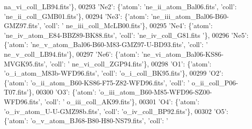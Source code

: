 \begin{DoxyCode}
{      na\_vi\_coll\_LB94.fits'}\},
00293                              \textcolor{stringliteral}{'Ne2'}: \{\textcolor{stringliteral}{'atom'}: \textcolor{stringliteral}{'ne\_ii\_atom\_Bal06.fits'}, \textcolor{stringliteral}{'coll'}: \textcolor{stringliteral}{'ne\_ii\_coll\_GMB01.fits'}\},
00294                              \textcolor{stringliteral}{'Ne3'}: \{\textcolor{stringliteral}{'atom'}: \textcolor{stringliteral}{'ne\_iii\_atom\_Bal06-B60-GMZ97.fits'}, \textcolor{stringliteral}{'coll'}: \textcolor{stringliteral}{'
      ne\_iii\_coll\_McLB00.fits'}\},
00295                              \textcolor{stringliteral}{'Ne4'}: \{\textcolor{stringliteral}{'atom'}: \textcolor{stringliteral}{'ne\_iv\_atom\_E84-BBZ89-BK88.fits'}, \textcolor{stringliteral}{'coll'}: \textcolor{stringliteral}{'ne\_iv\_coll\_G81.fits
      '}\},
00296                              \textcolor{stringliteral}{'Ne5'}: \{\textcolor{stringliteral}{'atom'}: \textcolor{stringliteral}{'ne\_v\_atom\_Bal06-B60-M83-GMZ97-U-BD93.fits'}, \textcolor{stringliteral}{'coll'}: \textcolor{stringliteral}{'
      ne\_v\_coll\_LB94.fits'}\},
00297                              \textcolor{stringliteral}{'Ne6'}: \{\textcolor{stringliteral}{'atom'}: \textcolor{stringliteral}{'ne\_vi\_atom\_Bal06-KS86-MVGK95.fits'}, \textcolor{stringliteral}{'coll'}: \textcolor{stringliteral}{'
      ne\_vi\_coll\_ZGP94.fits'}\},
00298                              \textcolor{stringliteral}{'O1'}: \{\textcolor{stringliteral}{'atom'}: \textcolor{stringliteral}{'o\_i\_atom\_M83b-WFD96.fits'}, \textcolor{stringliteral}{'coll'}: \textcolor{stringliteral}{'o\_i\_coll\_BK95.fits'}\},
00299                              \textcolor{stringliteral}{'O2'}: \{\textcolor{stringliteral}{'atom'}: \textcolor{stringliteral}{'o\_ii\_atom\_B60-KS86-F75-Z82-WFD96.fits'}, \textcolor{stringliteral}{'coll'}: \textcolor{stringliteral}{'
      o\_ii\_coll\_P06-T07.fits'}\},
00300                              \textcolor{stringliteral}{'O3'}: \{\textcolor{stringliteral}{'atom'}: \textcolor{stringliteral}{'o\_iii\_atom\_B60-M85-WFD96-SZ00-WFD96.fits'}, \textcolor{stringliteral}{'coll'}: \textcolor{stringliteral}{'
      o\_iii\_coll\_AK99.fits'}\},
00301                              \textcolor{stringliteral}{'O4'}: \{\textcolor{stringliteral}{'atom'}: \textcolor{stringliteral}{'o\_iv\_atom\_U-U-GMZ98b.fits'}, \textcolor{stringliteral}{'coll'}: \textcolor{stringliteral}{'o\_iv\_coll\_BP92.fits'}\},
00302                              \textcolor{stringliteral}{'O5'}: \{\textcolor{stringliteral}{'atom'}: \textcolor{stringliteral}{'o\_v\_atom\_BJ68-B80-H80-NS79.fits'}, \textcolor{stringliteral}{'coll'}: \textcolor{stringliteral}{'
}
\end{DoxyCode}
